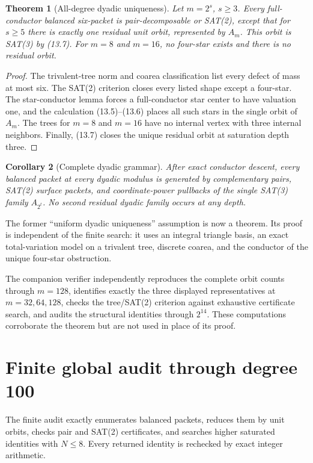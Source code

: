 \documentclass[11pt,oneside]{book}
\newtheorem{theorem}{Theorem}[chapter]
\newtheorem{corollary}[theorem]{Corollary}
\theoremstyle{definition}
\theoremstyle{remark}
\begin{document}
\begin{theorem}[All-degree dyadic uniqueness]
Let \(m=2^s\), \(s\ge3\). Every full-conductor balanced six-packet is pair-decomposable or SAT(2), except that for \(s\ge5\) there is exactly one residual unit orbit, represented by \(A_m\). This orbit is SAT(3) by (13.7). For \(m=8\) and \(m=16\), no four-star exists and there is no residual orbit.
\end{theorem}
\begin{proof}
The trivalent-tree norm and coarea classification list every defect of mass at most six. The SAT(2) criterion closes every listed shape except a four-star. The star-conductor lemma forces a full-conductor star center to have valuation one, and the calculation (13.5)--(13.6) places all such stars in the single orbit of \(A_m\). The trees for \(m=8\) and \(m=16\) have no internal vertex with three internal neighbors. Finally, (13.7) closes the unique residual orbit at saturation depth three.
\end{proof}

\begin{corollary}[Complete dyadic grammar]
After exact conductor descent, every balanced packet at every dyadic modulus is generated by complementary pairs, SAT(2) surface packets, and coordinate-power pullbacks of the single SAT(3) family \(A_{2^t}\). No second residual dyadic family occurs at any depth.
\end{corollary}

\begin{resultbox}
The former ``uniform dyadic uniqueness'' assumption is now a theorem. Its proof is independent of the finite search: it uses an integral triangle basis, an exact total-variation model on a trivalent tree, discrete coarea, and the conductor of the unique four-star obstruction.
\end{resultbox}

The companion verifier  independently reproduces the complete orbit counts through \(m=128\), identifies exactly the three displayed representatives at \(m=32,64,128\), checks the tree/SAT(2) criterion against exhaustive certificate search, and audits the structural identities through \(2^{14}\). These computations corroborate the theorem but are not used in place of its proof.

\chapter{Finite global audit through degree 100}
The finite audit exactly enumerates balanced packets, reduces them by unit orbits, checks pair and SAT(2) certificates, and searches higher saturated identities with \(N\le8\). Every returned identity is rechecked by exact integer arithmetic.
\end{document}
